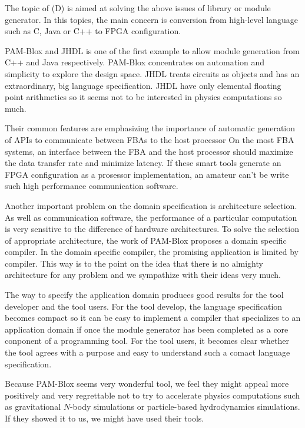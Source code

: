 \documentclass{llncs}
\begin{document}
The topic of (D) is aimed at solving the above issues of library or
module generator.  In this topics, the main concern is conversion from
high-level language such as C, Java or C++ to FPGA configuration.

PAM-Blox\cite{MMF97} and JHDL\cite{BH98} is one of the first example
to allow module generation from C++ and Java respectively.  PAM-Blox
concentrates on automation and simplicity to explore the design space.
JHDL treats circuits as objects and has an extraordinary, big language
specification.  JHDL have only elemental floating point arithmetics so
it seems not to be interested in physics computations so much.  

Their common features are emphasizing the importance of automatic
generation of APIs to communicate between FBAs to the host processor
On the most FBA systems, an interface between the FBA and the host
processor should maximize the data transfer rate and minimize latency.
If these smart tools generate an FPGA configuration as a prosessor
implementation, an amateur can't be write such high performance
communication software.

Another important problem on the domain specification is architecture
selection. As well as communication software, the performance of a
particular computation is very sensitive to the difference of hardware
architectures. To solve the selection of appropriate architecture, the
work of PAM-Blox proposes a domain specific compiler\cite{MPMF01}.  In
the domain specific compiler, the promising application is limited by
compiler. This way is to the point on the idea that there is no
almighty architecture for any problem and we sympathize with their
ideas very much. 

The way to specify the application domain produces good results for
the tool developer and the tool users.  For the tool develop, the
language specification becomes compact so it can be easy to implement
a compiler that specializes to an application domain if once the
module generator has been completed as a core conponent of a
programming tool.  For the tool users, it becomes clear whether the
tool agrees with a purpose and easy to understand such a comact
language specification.

Because PAM-Blox seems very wonderful tool, we feel they might appeal
more positively and very regrettable not to try to accelerate physics
computations such as gravitational $N$-body simulations or
particle-based hydrodynamics simulations. If they showed it to us, we
might have used their tools.
\end{document}
